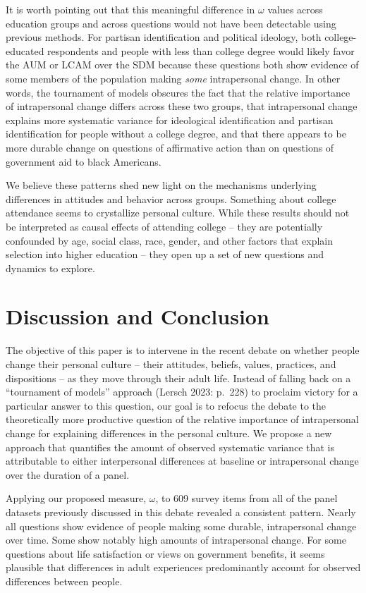 \documentclass[
  12pt,
]{article}
\begin{document}
It is worth pointing out that this meaningful difference in \(\omega\)
values across education groups and across questions would not have been
detectable using previous methods. For partisan identification and
political ideology, both college-educated respondents and people with
less than college degree would likely favor the AUM or LCAM over the SDM
because these questions both show evidence of some members of the
population making \emph{some} intrapersonal change. In other words, the
tournament of models obscures the fact that the relative importance of
intrapersonal change differs across these two groups, that intrapersonal
change explains more systematic variance for ideological identification
and partisan identification for people without a college degree, and
that there appears to be more durable change on questions of affirmative
action than on questions of government aid to black Americans.

We believe these patterns shed new light on the mechanisms underlying
differences in attitudes and behavior across groups. Something about
college attendance seems to crystallize personal culture. While these
results should not be interpreted as causal effects of attending college
-- they are potentially confounded by age, social class, race, gender,
and other factors that explain selection into higher education -- they
open up a set of new questions and dynamics to explore.

\hypertarget{discussion-and-conclusion}{%
\section{Discussion and Conclusion}\label{discussion-and-conclusion}}

The objective of this paper is to intervene in the recent debate on
whether people change their personal culture -- their attitudes,
beliefs, values, practices, and dispositions -- as they move through
their adult life. Instead of falling back on a ``tournament of models''
approach (Lersch 2023: p.~228) to proclaim victory for a particular
answer to this question, our goal is to refocus the debate to the
theoretically more productive question of the relative importance of
intrapersonal change for explaining differences in the personal culture.
We propose a new approach that quantifies the amount of observed
systematic variance that is attributable to either interpersonal
differences at baseline or intrapersonal change over the duration of a
panel.

Applying our proposed measure, \(\omega\), to 609 survey items from all
of the panel datasets previously discussed in this debate revealed a
consistent pattern. Nearly all questions show evidence of people making
some durable, intrapersonal change over time. Some show notably high
amounts of intrapersonal change. For some questions about life
satisfaction or views on government benefits, it seems plausible that
differences in adult experiences predominantly account for observed
differences between people.
\end{document}
